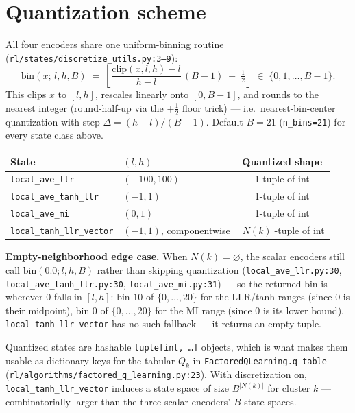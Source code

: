 \documentclass[11pt]{article}
\newcommand{\code}[1]{\texttt{#1}}
\newcommand{\file}[1]{\texttt{#1}}
\begin{document}
\section{Quantization scheme}

All four encoders share one uniform-binning routine
(\file{rl/states/discretize\_utils.py:3--9}):
\[
\mathrm{bin}(x;\,l,h,B) \;=\; \left\lfloor \frac{\mathrm{clip}(x,l,h) - l}{h - l}\,(B-1) \;+\; \tfrac12 \right\rfloor \;\in\; \{0,1,\dots,B-1\}.
\]
This clips $x$ to $[l,h]$, rescales linearly onto $[0, B-1]$, and rounds to the nearest
integer (round-half-up via the $+\tfrac12$ floor trick) — i.e.\ nearest-bin-center
quantization with step $\Delta = (h-l)/(B-1)$. Default $B = 21$ (\code{n\_bins=21})
for every state class above.

\begin{center}
\begin{tabular}{@{}llc@{}}
\toprule
State & $(l, h)$ & Quantized shape \\
\midrule
\code{local\_ave\_llr} & $(-100, 100)$ & 1-tuple of int \\
\code{local\_ave\_tanh\_llr} & $(-1, 1)$ & 1-tuple of int \\
\code{local\_ave\_mi} & $(0, 1)$ & 1-tuple of int \\
\code{local\_tanh\_llr\_vector} & $(-1, 1)$, componentwise & $|N(k)|$-tuple of int \\
\bottomrule
\end{tabular}
\end{center}

\textbf{Empty-neighborhood edge case.} When $N(k)=\varnothing$, the scalar encoders
still call $\mathrm{bin}(0.0; l, h, B)$ rather than skipping quantization
(\file{local\_ave\_llr.py:30}, \file{local\_ave\_tanh\_llr.py:30},
\file{local\_ave\_mi.py:31}) — so the returned bin is wherever $0$ falls in
$[l,h]$: bin $10$ of $\{0,\dots,20\}$ for the LLR/tanh ranges (since $0$ is their
midpoint), bin $0$ of $\{0,\dots,20\}$ for the MI range (since $0$ is its lower
bound). \code{local\_tanh\_llr\_vector} has no such fallback — it returns an empty
tuple.

Quantized states are hashable \code{tuple[int, \dots]} objects, which is what makes
them usable as dictionary keys for the tabular
$Q_k$ in \code{FactoredQLearning.q\_table} (\file{rl/algorithms/factored\_q\_learning.py:23}).
With discretization on, \code{local\_tanh\_llr\_vector} induces a state space of size
$B^{|N(k)|}$ for cluster $k$ — combinatorially larger than the three scalar encoders'
$B$-state spaces.
\end{document}
